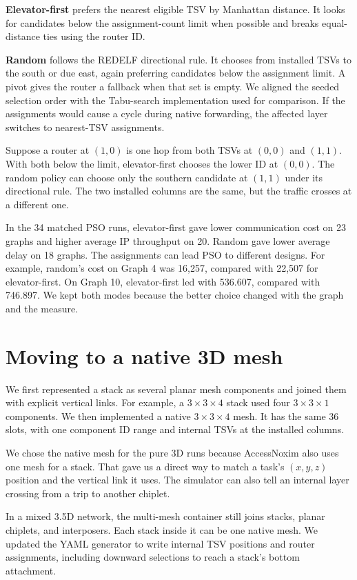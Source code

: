 \documentclass[12pt,a4paper]{article}
\begin{document}
\textbf{Elevator-first} prefers the nearest eligible TSV by Manhattan distance. It looks for candidates below the assignment-count limit when possible and breaks equal-distance ties using the router ID.

\textbf{Random} follows the REDELF directional rule. It chooses from installed TSVs to the south or due east, again preferring candidates below the assignment limit. A pivot gives the router a fallback when that set is empty. We aligned the seeded selection order with the Tabu-search implementation used for comparison. If the assignments would cause a cycle during native forwarding, the affected layer switches to nearest-TSV assignments.

Suppose a router at \((1,0)\) is one hop from both TSVs at \((0,0)\) and \((1,1)\). With both below the limit, elevator-first chooses the lower ID at \((0,0)\). The random policy can choose only the southern candidate at \((1,1)\) under its directional rule. The two installed columns are the same, but the traffic crosses at a different one.

In the 34 matched PSO runs, elevator-first gave lower communication cost on 23 graphs and higher average IP throughput on 20. Random gave lower average delay on 18 graphs. The assignments can lead PSO to different designs. For example, random's cost on Graph 4 was 16,257, compared with 22,507 for elevator-first. On Graph 10, elevator-first led with 536.607, compared with 746.897. We kept both modes because the better choice changed with the graph and the measure.

\section{Moving to a native 3D mesh}

We first represented a stack as several planar mesh components and joined them with explicit vertical links. For example, a \(3\times3\times4\) stack used four \(3\times3\times1\) components. We then implemented a native \(3\times3\times4\) mesh. It has the same 36 slots, with one component ID range and internal TSVs at the installed columns.

We chose the native mesh for the pure 3D runs because AccessNoxim also uses one mesh for a stack. That gave us a direct way to match a task's \((x,y,z)\) position and the vertical link it uses. The simulator can also tell an internal layer crossing from a trip to another chiplet.

In a mixed 3.5D network, the multi-mesh container still joins stacks, planar chiplets, and interposers. Each stack inside it can be one native mesh. We updated the YAML generator to write internal TSV positions and router assignments, including downward selections to reach a stack's bottom attachment.
\end{document}
